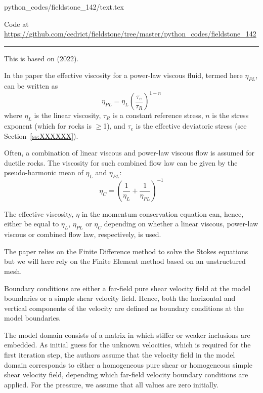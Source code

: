 
\begin{flushright} {\tiny {\color{gray} python\_codes/fieldstone\_142/text.tex}} \end{flushright}



\begin{center}

Code at \url{https://github.com/cedrict/fieldstone/tree/master/python_codes/fieldstone_142}
\end{center}

\par\noindent\rule{\textwidth}{0.4pt}

This \stone is based on \textcite{hams22} (2022).

In the paper the effective viscosity for a power-law viscous fluid, termed here $\eta_{PL}$, can be written
as
\[
\eta_{PL}=\eta_L \left( \frac{\tau_e}{\tau_R}  \right)^{1-n}
\]
where $\eta_L$ is the linear viscosity, $\tau_R$ is a constant reference stress, 
$n$ is the stress exponent (which for rocks is $\ge$1), and $\tau_e$ is the effective 
deviatoric stress (see Section~\ref{ss:XXXXXX}).

Often, a combination of linear viscous and power-law viscous flow is
assumed for ductile rocks. The viscosity for such combined flow law can
be given by the pseudo-harmonic mean of $\eta_L$ and $\eta_{PL}$:
\[
\eta_C = \left(  \frac{1}{\eta_L} + \frac{1}{\eta_{PL}} \right)^{-1}
\]

The effective viscosity, $\eta$ in the momentum conservation equation can, hence, either be
equal to $\eta_L$, $\eta_{PL}$ or $\eta_C$ depending on whether a linear viscous, power-law
viscous or combined flow law, respectively, is used.

The paper relies on the Finite Difference method to solve the Stokes equations but we will here 
rely on the Finite Element method based on an unstructured mesh.

Boundary conditions are either a far-field pure shear velocity field at the model boundaries
or a simple shear velocity field.
Hence, both the horizontal and vertical components of the velocity are defined as
boundary conditions at the model boundaries.

The model domain consists of a matrix in which stiffer or weaker inclusions are embedded. As
initial guess for the unknown velocities, which is required for the first
iteration step, the authors assume that the velocity field in the model domain
corresponds to either a homogeneous pure shear or homogeneous simple
shear velocity field, depending which far-field velocity boundary conditions are applied. 
For the pressure, we assume that all values are zero initially. 

